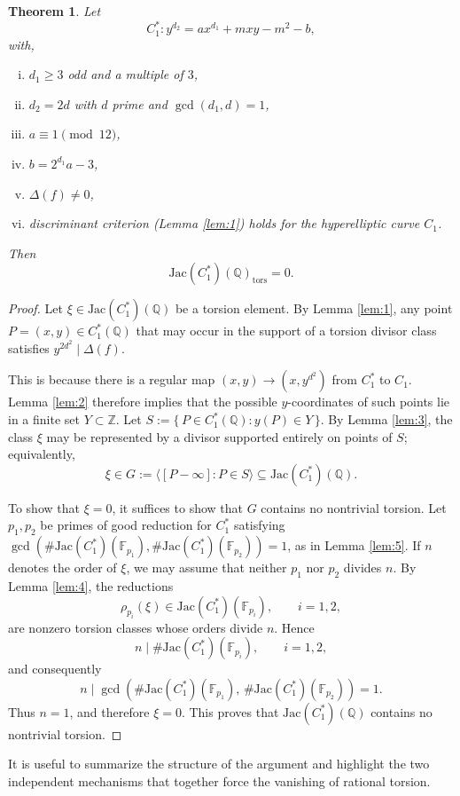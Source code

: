 \documentclass[12pt, reqno]{amsart}
\newtheorem{thm}{Theorem}[section]
\numberwithin{equation}{section}
\theoremstyle{definition}
\theoremstyle{nodefstyle}
\begin{document}
\begin{thm} \label{th6}
Let
\begin{equation}
C_1^*: y^{d_2} = a x^{d_1} + mxy - m^2 - b,\label{eq:final}
\end{equation}
with,
\begin{enumerate}[i.]
    \item \(d_1\ge 3\) odd and a multiple of \(3\),
    \item \(d_2 = 2d\) with \(d\) prime and \(\gcd(d_1,d)=1\),
    \item \(a\equiv 1\pmod{12}\),
    \item \(b = 2^{d_1}a - 3\),
    \item \(\Delta(f)\neq 0\),
    \item discriminant criterion (Lemma \autoref{lem:1}) holds for the hyperelliptic curve \(C_1\).
\end{enumerate}

Then
\[
\mathrm{Jac}(C_1^*)(\mathbb Q)_{\mathrm{tors}} = 0.
\]
\end{thm}
\begin{proof}
Let \(\xi \in \mathrm{Jac}(C_1^*)(\mathbb{Q})\) be a torsion element.  
By Lemma \autoref{lem:1}, any point \(P=(x,y)\in C_1^*(\mathbb{Q})\) that may occur in the support of a torsion divisor class satisfies \(y^{2d^2} \mid \Delta(f)\).  

This is because there is a regular map $(x,y)\to (x,y^{d^2})$ from $C_1^*$ to $C_1$.
Lemma \autoref{lem:2} therefore implies that the possible \(y\)-coordinates of such points lie in a finite set \(Y\subset\mathbb{Z}\).  
Let $S := \{\,P\in C_1^*(\mathbb{Q}) : y(P)\in Y\,\}$. By Lemma \autoref{lem:3}, the class \(\xi\) may be represented by a divisor supported entirely on points of \(S\); equivalently,
\[
\xi \in G := \langle [P-\infty] : P\in S \rangle \subseteq \mathrm{Jac}(C_1^*)(\mathbb{Q}).
\]

To show that \(\xi=0\), it suffices to show that \(G\) contains no nontrivial torsion.  
Let \(p_1,p_2\) be primes of good reduction for \(C_1^*\) satisfying $\gcd\!\left(
\#\mathrm{Jac}(C_1^*)(\mathbb{F}_{p_1}),
\#\mathrm{Jac}(C_1^*)(\mathbb{F}_{p_2})
\right) = 1$, as in Lemma \autoref{lem:5}.  
If \(n\) denotes the order of \(\xi\), we may assume that neither \(p_1\) nor \(p_2\) divides \(n\).  
By Lemma \autoref{lem:4}, the reductions
\[
\rho_{p_i}(\xi) \in \mathrm{Jac}(C_1^*)(\mathbb{F}_{p_i}), \qquad i=1,2,
\]
are nonzero torsion classes whose orders divide \(n\).  
Hence
\[
n \mid \#\mathrm{Jac}(C_1^*)(\mathbb{F}_{p_i}), \qquad i=1,2,
\]
and consequently
\[
n \mid
\gcd\!\left(
\#\mathrm{Jac}(C_1^*)(\mathbb{F}_{p_1}),\,
\#\mathrm{Jac}(C_1^*)(\mathbb{F}_{p_2})
\right)
= 1.
\]
Thus \(n=1\), and therefore \(\xi = 0\).  
This proves that \(\mathrm{Jac}(C_1^*)(\mathbb{Q})\) contains no nontrivial torsion.
\end{proof}
\vspace{5mm}
It is useful to summarize the structure of the argument and highlight the two independent mechanisms that together force the vanishing of rational torsion.
\end{document}
